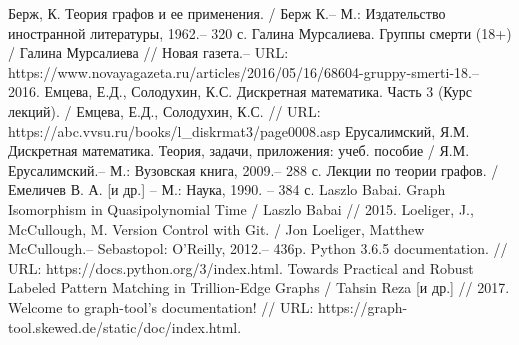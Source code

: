 

\begin{thebibliography}{}
	  Берж, К. Теория графов и ее применения. / Берж К.-- М.: Издательство иностранной литературы, 1962.-- 320 с.
	  Галина Мурсалиева. Группы смерти (18+) / Галина Мурсалиева // Новая газета.-- URL: https://www.novayagazeta.ru/articles/2016/05/16/68604-gruppy-smerti-18.-- 2016.
	  Емцева, Е.Д., Солодухин, К.С. Дискретная математика. Часть 3 (Курс лекций). / Емцева, Е.Д., Солодухин, К.С. // URL: https://abc.vvsu.ru/books/l\_diskrmat3/page0008.asp
	  Ерусалимский, Я.М. Дискретная математика. Теория, задачи, приложения: учеб. пособие / Я.М. Ерусалимский.-- М.: Вузовская книга, 2009.-- 288 с.
	 Лекции по теории графов. / Емеличев В. А. [и др.] -- М.: Наука, 1990. -- 384 с.	
	  Laszlo Babai. Graph Isomorphism in Quasipolynomial Time / Laszlo Babai // 2015.
	 Loeliger, J., McCullough, M. Version Control with Git. / Jon Loeliger, Matthew McCullough.-- Sebastopol: O'Reilly, 2012.-- 436p.
	 Python 3.6.5 documentation. // URL: https://docs.python.org/3/index.html.
	  Towards Practical and Robust Labeled Pattern Matching in Trillion-Edge Graphs / Tahsin Reza [и др.] // 2017.
	 Welcome to graph-tool’s documentation! // URL: https://graph-tool.skewed.de/static/doc/index.html.
\end{thebibliography}
